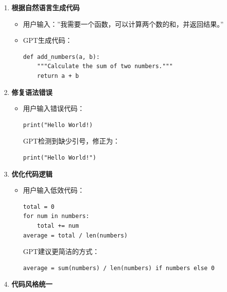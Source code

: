 \begin{enumerate}
  \def\labelenumi{\arabic{enumi}.}
  \item
        \textbf{根据自然语言生成代码}

        \begin{itemize}
          \item
                用户输入：''我需要一个函数，可以计算两个数的和，并返回结果。''
          \item
                GPT生成代码：

                \begin{lstlisting}
def add_numbers(a, b):
    """Calculate the sum of two numbers."""
    return a + b
\end{lstlisting}


        \end{itemize}

  \item
        \textbf{修复语法错误}

        \begin{itemize}
          \item
                用户输入错误代码：

                \begin{lstlisting}
print("Hello World!)
\end{lstlisting}

                GPT检测到缺少引号，修正为：

                \begin{lstlisting}
print("Hello World!")
\end{lstlisting}
        \end{itemize}
  \item
        \textbf{优化代码逻辑}

        \begin{itemize}
          \item
                用户输入低效代码：

                \begin{lstlisting}
total = 0
for num in numbers:
    total += num
average = total / len(numbers)
\end{lstlisting}

                GPT建议更简洁的方式：

                \begin{lstlisting}
average = sum(numbers) / len(numbers) if numbers else 0
\end{lstlisting}
        \end{itemize}
  \item
        \textbf{代码风格统一}


\end{enumerate}
